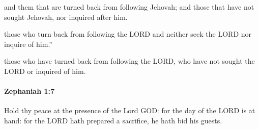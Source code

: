 			\begin{versebox}
					\item[BHS] 
					\item[LXX] 
					\item[ASV] and them that are turned back from following Jehovah; and those that have not sought Jehovah, nor inquired after him.
					\item[NIV] those who turn back from following the LORD and neither seek the LORD nor inquire of him.”
					\item[NRSV] those who have turned back from following the LORD, who have not sought the LORD or inquired of him.
			\end{versebox}

		\paragraph{Zephaniah 1:7} %
			\label{ZEPHANIAH-1-7}

			Hold thy peace at the presence of the Lord GOD: for the day of the LORD is at hand: for the LORD hath prepared a sacrifice, he hath bid his guests.


